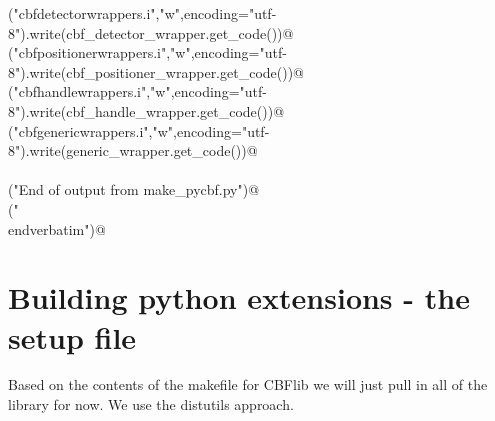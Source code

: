 \documentclass[10pt,a4paper,twoside,notitlepage]{article}
\begin{document}
\begin{flushleft}
\begin{minipage}{\linewidth}
\begin{list}{}{}
\mbox{}\verb@open("cbfdetectorwrappers.i","w",encoding="utf-8").write(cbf_detector_wrapper.get_code())@\\
\mbox{}\verb@open("cbfpositionerwrappers.i","w",encoding="utf-8").write(cbf_positioner_wrapper.get_code())@\\
\mbox{}\verb@open("cbfhandlewrappers.i","w",encoding="utf-8").write(cbf_handle_wrapper.get_code())@\\
\mbox{}\verb@open("cbfgenericwrappers.i","w",encoding="utf-8").write(generic_wrapper.get_code())@\\
\mbox{}\verb@@\\
\mbox{}\verb@print("End of output from make_pycbf.py")@\\
\mbox{}\verb@print("\\end{verbatim}")@\\
\mbox{}\verb@@{\NWsep}
\end{list}
\vspace{-1.5ex}
\footnotesize
\begin{list}{}{\setlength{\itemsep}{-\parsep}\setlength{\itemindent}{-\leftmargin}}

\item{}
\end{list}
\end{minipage}\vspace{4ex}
\end{flushleft}
\section{Building python extensions - the setup file}


Based on the contents of the makefile for CBFlib we will just 
pull in all of the library for now. We use the distutils approach.
\end{document}
